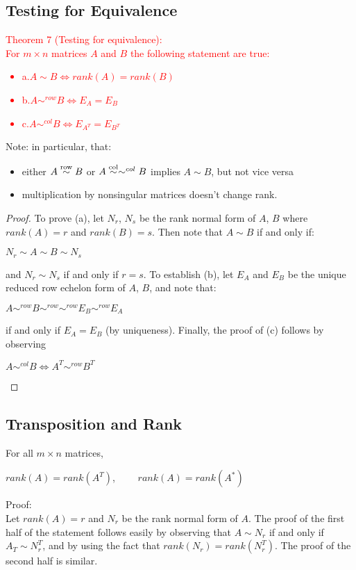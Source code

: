 \documentclass[UTF8,a4paper,11pt]{amsbook}
\begin{document}
\subsection{Testing for Equivalence}
\textcolor{red}{Theorem 7 (Testing for equivalence):\\
For $m\times n$ matrices $A$ and $B$ the following statement are true:
\begin{itemize}
\item a.$A\sim B \iff rank(A) = rank(B)$ 
\item b.$A\sim^{row} B \iff E_A = E_B$
\item c.$A\sim^{col} B \iff E_{A^T} = E_{B^T}$
\end{itemize}}
Note: in particular, that:
\begin{itemize}
\item either $A \overset{\rm{row}}{\sim} B$ or $A \overset{\rm{col}}{\sim} \sim^{col} B$ implies $A\sim B$, but not vice versa
\item multiplication by nonsingular matrices doesn't change rank.  
\end{itemize}
\begin{proof}
To prove (a), let $N_r$, $N_s$ be the rank normal form of $A$, $B$ where $rank(A) =r$ and $rank(B)=s$. Then note that $A\sim B$ if and only if:
\begin{center}
$N_r\sim A\sim B\sim N_s$
\end{center}
and $N_r\sim N_s$ if and only if $r=s$. To establish (b), let $E_A$ and $E_B$ be the unique reduced row echelon form of $A$, $B$, and note that:
\begin{center}
$A\sim^{row}B\sim^{row}\sim^{row}E_B\sim^{row}E_A$
\end{center}
if and only if $E_A=E_B$ (by uniqueness). Finally, the proof of (c) follows by observing
\begin{center}
$A\sim^{col}B \iff A^T \sim^{row}B^T$
\end{center}
\end{proof}

\subsection{Transposition and Rank}
For all $m\times n$ matrices,
\begin{center}
$rank(A)=rank(A^T)$, $\qquad rank(A)=rank(A^*)$
\end{center}
Proof: \\
Let $rank(A)=r$ and $N_r$ be the rank normal form of $A$. The proof of the first half of the statement follows easily by observing that $A\sim N_r$ if and only if $A_T\sim N_r^T$, and by using the fact that $rank(N_r)=rank(N_r^T)$. The proof of the second half is similar. 
\end{document}
